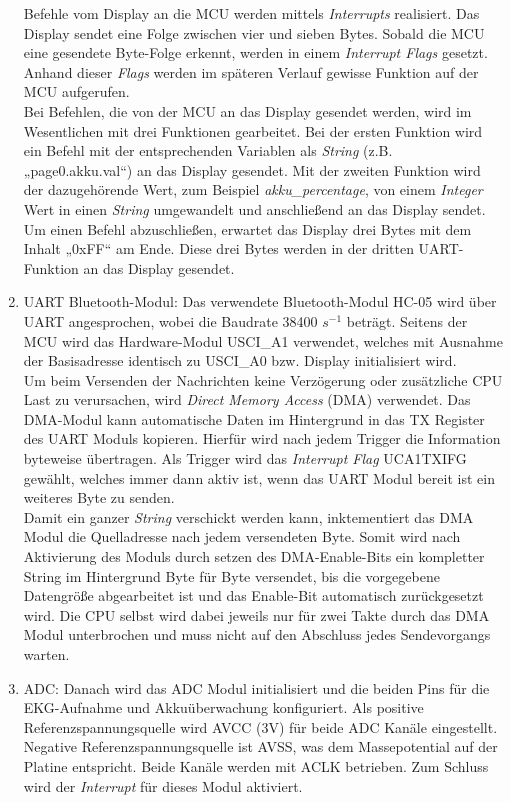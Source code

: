 \begin{enumerate}
    Befehle vom Display an die MCU werden mittels \textit{Interrupts} realisiert. Das Display sendet eine Folge zwischen vier und sieben Bytes. Sobald die MCU eine gesendete Byte-Folge erkennt, werden in einem \textit{Interrupt Flags} gesetzt. Anhand dieser \textit{Flags} werden im späteren Verlauf gewisse Funktion auf der MCU aufgerufen.\\
    Bei Befehlen, die von der MCU an das Display gesendet werden, wird im Wesentlichen mit drei Funktionen gearbeitet. Bei der ersten Funktion wird ein Befehl mit der entsprechenden Variablen als \textit{String} (z.B. „page0.akku.val“) an das Display gesendet. Mit der zweiten Funktion wird der dazugehörende Wert, zum Beispiel \textit{akku\_percentage}, von einem \textit{Integer} Wert in einen \textit{String} umgewandelt und anschließend an das Display sendet. Um einen Befehl abzuschließen, erwartet das Display drei Bytes mit dem Inhalt „0xFF“ am Ende. Diese drei Bytes werden in der dritten UART-Funktion an das Display gesendet.
    \item UART Bluetooth-Modul: Das verwendete Bluetooth-Modul HC-05 wird über UART angesprochen, wobei die Baudrate 38400 $s^{-1}$ beträgt. Seitens der MCU wird das Hardware-Modul USCI\_A1 verwendet, welches mit Ausnahme der Basisadresse identisch zu USCI\_A0 bzw. Display initialisiert wird.\\
    Um beim Versenden der Nachrichten keine Verzögerung oder zusätzliche CPU Last zu verursachen, wird \textit{Direct Memory Access} (DMA) verwendet. Das DMA-Modul kann automatische Daten im Hintergrund in das TX Register des UART Moduls kopieren. Hierfür wird nach jedem Trigger die Information byteweise übertragen. Als Trigger wird das \textit{Interrupt Flag} UCA1TXIFG gewählt, welches immer dann aktiv ist, wenn das UART Modul bereit ist ein weiteres Byte zu senden.\\
    Damit ein ganzer \textit{String} verschickt werden kann, inktementiert das DMA Modul die Quelladresse nach jedem versendeten Byte. Somit wird nach Aktivierung des Moduls durch setzen des DMA-Enable-Bits ein kompletter String im Hintergrund Byte für Byte versendet, bis die vorgegebene Datengröße abgearbeitet ist und das Enable-Bit automatisch zurückgesetzt wird. Die CPU selbst wird dabei jeweils nur für zwei Takte durch das DMA Modul unterbrochen und muss nicht auf den Abschluss jedes Sendevorgangs warten.
    \item ADC: Danach wird das ADC Modul initialisiert und die beiden Pins für die EKG-Aufnahme und Akkuüberwachung konfiguriert. Als positive Referenzspannungsquelle wird AVCC (3V) für beide ADC Kanäle eingestellt. Negative Referenzspannungsquelle ist AVSS, was dem Massepotential auf der Platine entspricht. Beide Kanäle werden mit ACLK betrieben. Zum Schluss wird der \textit{Interrupt} für dieses Modul aktiviert.

\end{enumerate}
